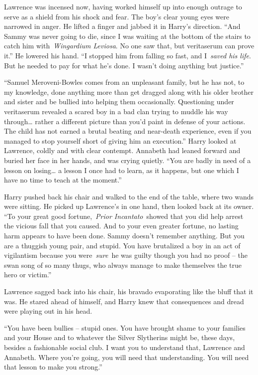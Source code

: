 Lawrence was incensed now, having worked himself up into enough outrage
to serve as a shield from his shock and fear. The boy's clear young eyes
were narrowed in anger. He lifted a finger and jabbed it in Harry's
direction. ``And Sammy was never going to die, since I was waiting at
the bottom of the stairs to catch him with~\emph{Wingardium Leviosa}. No
one saw that, but veritaserum can prove it.'' He lowered his hand. ``I
stopped him from falling so fast, and I~\emph{saved his life}. But he
needed to pay for what he's done. I wasn't doing anything but justice.''

``Samuel Meroveni-Bowles comes from an unpleasant family, but he has
not, to my knowledge, done anything more than get dragged along with his
older brother and sister and be bullied into helping them occasionally.
Questioning under veritaserum revealed a scared boy in a bad clan trying
to muddle his way through\ldots{} rather a different picture than you'd
paint in defense of your actions. The child has not earned a brutal
beating and near-death experience, even if you managed to stop yourself
short of giving him an execution.'' Harry looked at Lawrence, coldly and
with clear contempt. Annabeth had leaned forward and buried her face in
her hands, and was crying quietly. ``You are badly in need of a lesson
on losing\ldots{} a lesson I once had to learn, as it happens, but one
which I have no time to teach at the moment.''

Harry pushed back his chair and walked to the end of the table, where
two wands were sitting. He picked up Lawrence's in one hand, then looked
back at its owner. ``To your great good fortune,~\emph{Prior
Incantato}~showed that you did help arrest the vicious fall that you
caused. And to your even greater fortune, no lasting harm appears to
have been done. Sammy doesn't remember anything. But you are a thuggish
young pair, and stupid. You have brutalized a boy in an act of
vigilantism because you were~\emph{sure}~he was guilty though you had no
proof -- the swan song of so many thugs, who always manage to make
themselves the true hero or victim.''

Lawrence sagged back into his chair, his bravado evaporating like the
bluff that it was. He stared ahead of himself, and Harry knew that
consequences and dread were playing out in his head.

``You have been bullies -- stupid ones. You have brought shame to your
families and your House and to whatever the Silver Slytherins might be,
these days, besides a fashionable social club. I want you to understand
that, Lawrence and Annabeth. Where you're going, you will need that
understanding. You will need that lesson to make you strong.''

